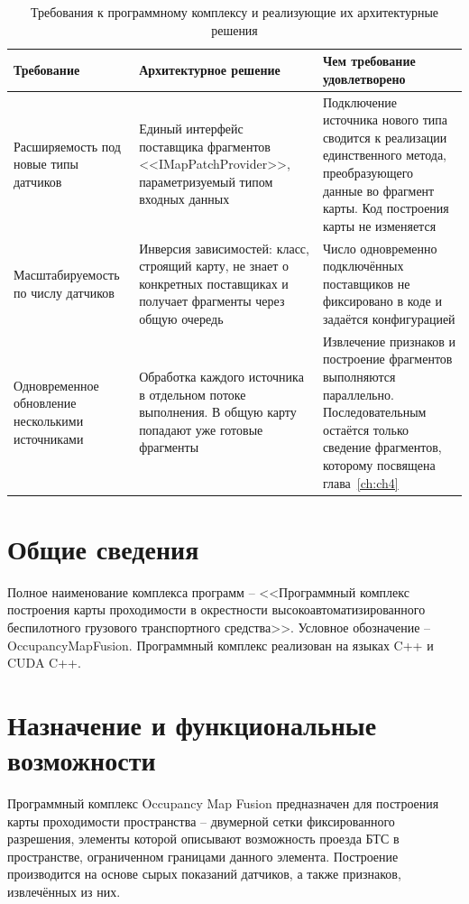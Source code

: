 \begin{table}[htbp]
	\small
	\centering
	\begin{tabular}{|p{}|p{}|p{}|}
		\hline
		\textbf{Требование} & \textbf{Архитектурное решение} & \textbf{Чем требование удовлетворено} \\
		\hline
		Расширяемость под новые типы датчиков & Единый интерфейс поставщика фрагментов <<IMapPatchProvider>>, параметризуемый типом входных данных & Подключение источника нового типа сводится к реализации единственного метода, преобразующего данные во фрагмент карты. Код построения карты не изменяется \\
		\hline
		Масштабируемость по числу датчиков & Инверсия зависимостей: класс, строящий карту, не знает о конкретных поставщиках и получает фрагменты через общую очередь & Число одновременно подключённых поставщиков не фиксировано в коде и задаётся конфигурацией \\
		\hline
		Одновременное обновление несколькими источниками & Обработка каждого источника в отдельном потоке выполнения. В общую карту попадают уже готовые фрагменты & Извлечение признаков и построение фрагментов выполняются параллельно. Последовательным остаётся только сведение фрагментов, которому посвящена глава~\cref{ch:ch4} \\
		\hline
	\end{tabular}
	\caption{Требования к программному комплексу и реализующие их архитектурные решения}
	\label{tab:omf_requirements}
\end{table}

\section{Общие сведения}

Полное наименование комплекса программ -- <<Программный комплекс построения карты проходимости в окрестности высокоавтоматизированного беспилотного грузового транспортного средства>>. Условное обозначение -- OccupancyMapFusion. Программный комплекс реализован на языках C++ и CUDA C++.

\section{Назначение и функциональные возможности}

Программный комплекс Occupancy Map Fusion предназначен для построения карты проходимости пространства -- двумерной сетки фиксированного разрешения, элементы которой описывают возможность проезда БТС в пространстве, ограниченном границами данного элемента. Построение производится на основе сырых показаний датчиков, а также признаков, извлечённых из них.

